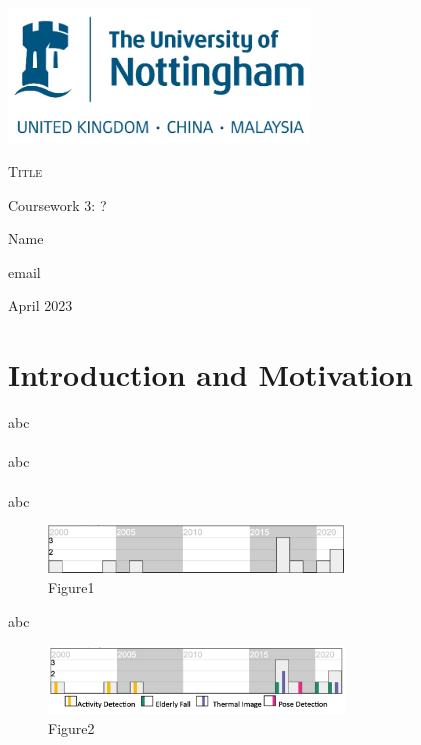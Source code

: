 \documentclass[12pt]{article}
\begin{document}
\begin{titlepage}
    \centering
    \includegraphics[width=0.6\textwidth]{Logo.png}\par\vspace{1cm}
    \vspace{1cm}
    {\scshape\LARGE Title\par}
    \vspace{2.5cm}
    {\Large Coursework 3: ?\par}
    \vspace{6cm}
    {\Large Name\par}
    \vspace{0.5cm}
    {\Large email\par}
    \vfill
    {\Large April 2023\par}
\end{titlepage}

\section{Introduction and Motivation}

abc
\\ \hspace*{\fill} \\
abc
\\ \hspace*{\fill} \\
abc

\begin{figure}[H]
\centering
\includegraphics[width=0.7\textwidth]{meta-data.png}
\caption{Figure1} 
\end{figure}

\noindent abc

\begin{figure}[H]
\centering
\includegraphics[width=0.7\textwidth]{supplementary-figure.png}
\caption{Figure2} 
\end{figure}
\end{document}
